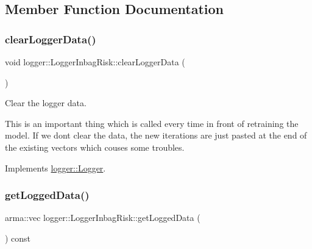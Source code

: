 \subsection{Member Function Documentation}
\mbox{\label{classlogger_1_1_logger_inbag_risk_ad5428486e370ae88e3bcb3a6c18d0f44}} 
\subsubsection{\texorpdfstring{clear\+Logger\+Data()}{clearLoggerData()}}
{\footnotesize\ttfamily void logger\+::\+Logger\+Inbag\+Risk\+::clear\+Logger\+Data (\begin{DoxyParamCaption}{ }\end{DoxyParamCaption})\hspace{0.3cm}{\ttfamily [virtual]}}



Clear the logger data. 

This is an important thing which is called every time in front of retraining the model. If we don\textquotesingle{}t clear the data, the new iterations are just pasted at the end of the existing vectors which couses some troubles. 

Implements \mbox{\hyperlink{classlogger_1_1_logger_a8c68db2430fa84b67528bfa6ae45a516}{logger\+::\+Logger}}.

\mbox{\label{classlogger_1_1_logger_inbag_risk_abde2b1db608804ca90ce92cd0e5dde12}} 
\subsubsection{\texorpdfstring{get\+Logged\+Data()}{getLoggedData()}}
{\footnotesize\ttfamily arma\+::vec logger\+::\+Logger\+Inbag\+Risk\+::get\+Logged\+Data (\begin{DoxyParamCaption}{ }\end{DoxyParamCaption}) const\hspace{0.3cm}{\ttfamily [virtual]}}




